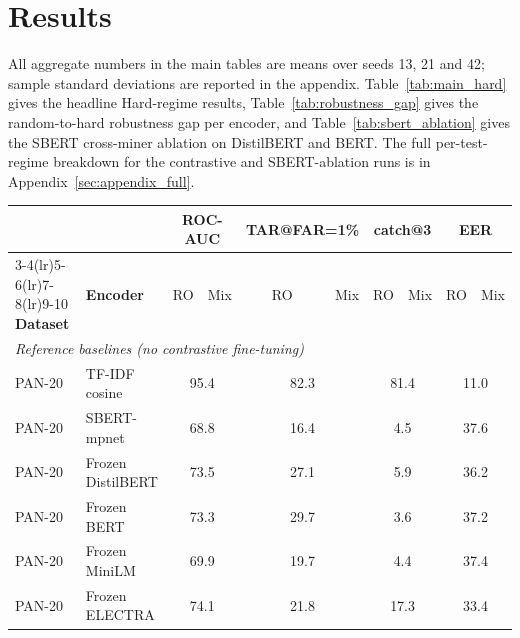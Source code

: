 \documentclass[11pt]{article}
\begin{document}
\section{Results}
\label{sec:results}

All aggregate numbers in the main tables are means over seeds 13, 21 and 42; sample standard deviations are reported in the appendix. Table~\ref{tab:main_hard} gives the headline Hard-regime results, Table~\ref{tab:robustness_gap} gives the random-to-hard robustness gap per encoder, and Table~\ref{tab:sbert_ablation} gives the SBERT cross-miner ablation on DistilBERT and BERT. The full per-test-regime breakdown for the contrastive and SBERT-ablation runs is in Appendix~\ref{sec:appendix_full}.

\begin{table}[!t]
\centering
\scriptsize
\setlength{\tabcolsep}{3pt}
\begin{tabular}{l l rr rr rr rr}
\toprule
& & \multicolumn{2}{c}{\textbf{ROC-AUC}} & \multicolumn{2}{c}{\textbf{TAR@FAR=1\%}} & \multicolumn{2}{c}{\textbf{catch@3}} & \multicolumn{2}{c}{\textbf{EER}} \\
\cmidrule(lr){3-4}\cmidrule(lr){5-6}\cmidrule(lr){7-8}\cmidrule(lr){9-10}
\textbf{Dataset} & \textbf{Encoder} & RO & Mix & RO & Mix & RO & Mix & RO & Mix \\
\midrule
\multicolumn{10}{l}{\textit{Reference baselines (no contrastive fine-tuning)}} \\
PAN-20  & TF-IDF cosine     & \multicolumn{2}{c}{95.4} & \multicolumn{2}{c}{82.3} & \multicolumn{2}{c}{81.4} & \multicolumn{2}{c}{11.0} \\
PAN-20  & SBERT-mpnet       & \multicolumn{2}{c}{68.8} & \multicolumn{2}{c}{16.4} & \multicolumn{2}{c}{\phantom{0}4.5} & \multicolumn{2}{c}{37.6} \\
PAN-20  & Frozen DistilBERT & \multicolumn{2}{c}{73.5} & \multicolumn{2}{c}{27.1} & \multicolumn{2}{c}{\phantom{0}5.9} & \multicolumn{2}{c}{36.2} \\
PAN-20  & Frozen BERT       & \multicolumn{2}{c}{73.3} & \multicolumn{2}{c}{29.7} & \multicolumn{2}{c}{\phantom{0}3.6} & \multicolumn{2}{c}{37.2} \\
PAN-20  & Frozen MiniLM     & \multicolumn{2}{c}{69.9} & \multicolumn{2}{c}{19.7} & \multicolumn{2}{c}{\phantom{0}4.4} & \multicolumn{2}{c}{37.4} \\
PAN-20  & Frozen ELECTRA    & \multicolumn{2}{c}{74.1} & \multicolumn{2}{c}{21.8} & \multicolumn{2}{c}{17.3} & \multicolumn{2}{c}{33.4} \\

\end{tabular}
\end{table}
\end{document}
